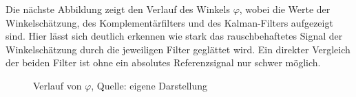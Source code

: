 \newpage
Die nächste Abbildung zeigt den Verlauf des Winkels $\varphi$, wobei die Werte der Winkelschätzung, des Komplementärfilters und des Kalman-Filters aufgezeigt sind. Hier lässt sich deutlich erkennen wie stark das rauschbehaftetes Signal der Winkelschätzung durch die jeweiligen Filter geglättet wird. Ein direkter Vergleich der beiden Filter ist ohne ein absolutes Referenzsignal nur schwer möglich.

\begin{figure}[h!]
\centering
\caption{Verlauf von $\varphi$, Quelle: eigene Darstellung}
\end{figure}

